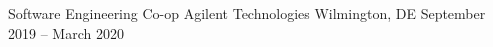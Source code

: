 \begin{cventries}
  \cventry
  {Software Engineering Co-op}
  {Agilent Technologies}
  {Wilmington, DE}
  {September 2019 – March 2020}
  {\begin{cvitems}
	  \end{cvitems}}
	
	

\end{cventries}
\vspace{-.65cm}